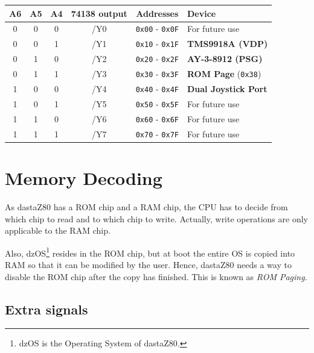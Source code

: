 \documentclass[a4paper,11pt]{article}
\begin{document}
    \begin{tabular}{| c | c | c | c | c | m{4.5cm} | }
        \hline
        \rowcolor{lightgray}
        A6 & A5 & A4 & 74138 output & Addresses & Device\\
        \hline
        0 & 0 & 0 & /Y0 & \texttt{0x00} - \texttt{0x0F} & For future use\\
        \hline
        0 & 0 & 1 & /Y1 & \texttt{0x10} - \texttt{0x1F} & \textbf{TMS9918A (VDP)}\\
        \hline
        0 & 1 & 0 & /Y2 & \texttt{0x20} - \texttt{0x2F} & \textbf{AY-3-8912 (PSG)}\\
        \hline
        0 & 1 & 1 & /Y3 & \texttt{0x30} - \texttt{0x3F} & \textbf{ROM Page}
        (\texttt{0x38})\\
        \hline
        1 & 0 & 0 & /Y4 & \texttt{0x40} - \texttt{0x4F} & \textbf{Dual Joystick
        Port}\\
        \hline
        1 & 0 & 1 & /Y5 & \texttt{0x50} - \texttt{0x5F} & For future use\\
        \hline
        1 & 1 & 0 & /Y6 & \texttt{0x60} - \texttt{0x6F} & For future use\\
        \hline
        1 & 1 & 1 & /Y7 & \texttt{0x70} - \texttt{0x7F} & For future use\\
        \hline
    \end{tabular}
    
    \pagebreak
    \section{Memory Decoding}

    As dastaZ80 has a ROM chip and a RAM chip, the CPU has to decide from which 
    chip to read and to which chip to write. Actually, write operations are only
    applicable to the RAM chip.

    Also, dzOS\footnote{dzOS is the Operating System of dastaZ80.} resides in
    the ROM chip, but at boot the entire OS is copied into RAM so that it can be
    modified by the user. Hence, dastaZ80 needs a way to disable the ROM chip
    after the copy has finished. This is known as \textit{ROM Paging}.

    \subsection{Extra signals}
\end{document}

